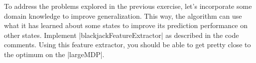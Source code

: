 \item {}
To address the problems explored in the previous exercise, let's incorporate
some domain knowledge to improve generalization.  This way, the algorithm can
use what it has learned about some states to improve its prediction performance
on other states. Implement |blackjackFeatureExtractor| as described
in the code comments. Using this feature extractor, you should be able to get
pretty close to the optimum on the |largeMDP|.
